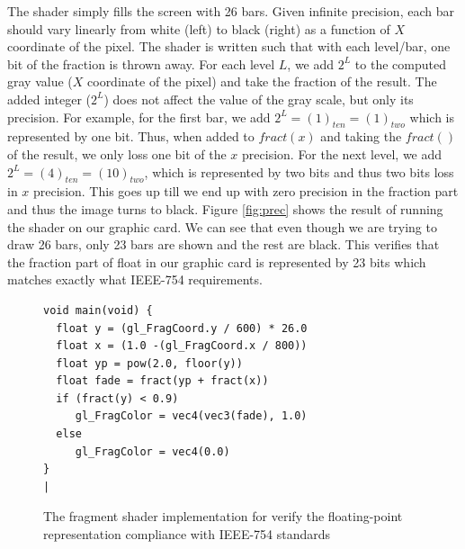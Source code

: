 The shader simply fills the screen with 26 bars. Given infinite precision, each bar should vary linearly from white (left) to black (right) as a function of $X$ coordinate of the pixel. The shader is written such that with each level/bar, one bit of the fraction is thrown away. For each level $L$, we add $2^{L}$ to the computed gray value ($X$ coordinate of the pixel) and take the fraction of the result. The added integer ($2^{L}$) does not affect the value of the gray scale, but only its precision. For example, for the first bar, we add  $2^{L}=(1)_{ten}=(1)_{two}$ which is represented by one bit. Thus, when added to $fract(x)$ and taking the $fract()$ of the result, we only loss one bit of the $x$ precision. For the next level, we add $2^{L}=(4)_{ten}=(10)_{two}$, which is represented by two bits and thus two bits loss in $x$ precision. This goes up till we end up with zero precision in the fraction part and thus the image turns to black. Figure \ref{fig:prec} shows the result of running the shader on our graphic card. We can see that even though we are trying to draw 26 bars, only 23 bars are shown and the rest are black. This verifies that the fraction part of float in our graphic card is represented by 23 bits which matches exactly what IEEE-754 requirements. 

\begin{figure}[t!]
\centering
\begin{minipage}[t]{\textwidth}
\centering
\begin{lstlisting}[label=list:ExampleShader,
escapechar=|,
caption={
  Fragment Shader.
}]
void main(void) {
  float y = (gl_FragCoord.y / 600) * 26.0
  float x = (1.0 -(gl_FragCoord.x / 800))
  float yp = pow(2.0, floor(y))
  float fade = fract(yp + fract(x))
  if (fract(y) < 0.9)
     gl_FragColor = vec4(vec3(fade), 1.0)
  else
     gl_FragColor = vec4(0.0)
}
|
\end{lstlisting}
\end{minipage}

\caption{The fragment shader implementation for verify the floating-point representation compliance with IEEE-754 standards}
\label{fig:shader1}
\end{figure}


